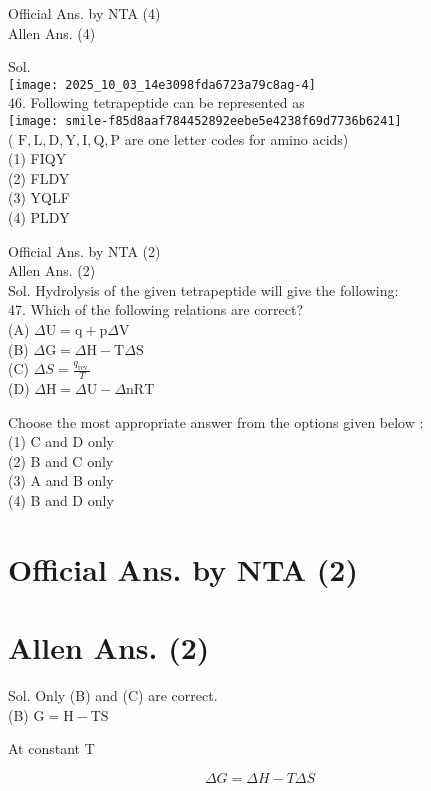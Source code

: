 \documentclass[10pt]{article}
\begin{document}
Official Ans. by NTA (4)\\
Allen Ans. (4)

Sol.\\
\texttt{[image: 2025\_10\_03\_14e3098fda6723a79c8ag-4]}\\
46. Following tetrapeptide can be represented as\\
\texttt{[image: smile-f85d8aaf784452892eebe5e4238f69d7736b6241]}\\
( \(\mathrm{F}, \mathrm{L}, \mathrm{D}, \mathrm{Y}, \mathrm{I}, \mathrm{Q}, \mathrm{P}\) are one letter codes for amino acids)\\
(1) FIQY\\
(2) FLDY\\
(3) YQLF\\
(4) PLDY

Official Ans. by NTA (2)\\
Allen Ans. (2)\\
Sol. Hydrolysis of the given tetrapeptide will give the following:\\
47. Which of the following relations are correct?\\
(A) \(\Delta \mathrm{U}=\mathrm{q}+\mathrm{p} \Delta \mathrm{V}\)\\
(B) \(\Delta \mathrm{G}=\Delta \mathrm{H}-\mathrm{T} \Delta \mathrm{S}\)\\
(C) \(\Delta S=\frac{q_{\text {rev }}}{T}\)\\
(D) \(\Delta \mathrm{H}=\Delta \mathrm{U}-\Delta \mathrm{nRT}\)

Choose the most appropriate answer from the options given below :\\
(1) C and D only\\
(2) B and C only\\
(3) A and B only\\
(4) B and D only

\section*{Official Ans. by NTA (2)}
\section*{Allen Ans. (2)}
Sol. Only (B) and (C) are correct.\\
(B) \(\mathrm{G}=\mathrm{H}-\mathrm{TS}\)

At constant T

\[
\Delta G=\Delta H-T \Delta S
\]
\end{document}
